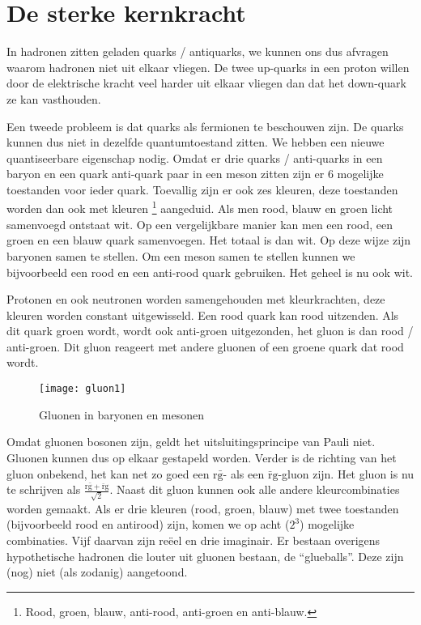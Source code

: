 \section{De sterke kernkracht}

In hadronen zitten geladen quarks / antiquarks, we kunnen ons dus
afvragen waarom hadronen niet uit elkaar vliegen. De twee up-quarks
in een proton willen door de elektrische kracht veel harder uit elkaar
vliegen dan dat het down-quark ze kan vasthouden. 

Een tweede probleem is dat quarks als fermionen te beschouwen zijn. De
quarks kunnen dus niet in dezelfde quantumtoestand zitten. We hebben een
nieuwe quantiseerbare eigenschap nodig. Omdat er drie quarks /
anti-quarks in een baryon en een quark anti-quark paar in een meson
zitten zijn er 6 mogelijke toestanden voor ieder quark. Toevallig zijn
er ook zes kleuren, deze toestanden worden dan ook met kleuren
\footnote{Rood, groen, blauw, anti-rood, anti-groen en anti-blauw.}
aangeduid. Als men rood, blauw en groen licht samenvoegd ontstaat wit.
Op een vergelijkbare manier kan men een rood, een groen en een blauw
quark samenvoegen. Het totaal is dan wit. Op deze wijze zijn baryonen
samen te stellen. Om een meson samen te stellen kunnen we bijvoorbeeld
een rood en een anti-rood quark gebruiken. Het geheel is nu ook wit.

Protonen en ook neutronen worden samengehouden met kleurkrachten,
deze kleuren worden constant uitgewisseld. Een rood quark kan rood
uitzenden. Als dit quark groen wordt, wordt ook anti-groen uit\-gezonden,
het gluon is dan rood / anti-groen. Dit gluon reageert met andere
gluonen of een groene quark dat rood wordt.

\begin{figure}[H]
\noindent \begin{centering}
\texttt{[image: gluon1]}
\par\end{centering}

\caption{Gluonen in baryonen en mesonen}
\end{figure}


Omdat gluonen bosonen zijn, geldt het uitsluitingsprincipe van Pauli
niet. Gluonen kunnen dus op elkaar gestapeld worden. Verder is de
richting van het gluon onbekend, het kan net zo goed een $\mathrm{r\bar{g}}$-
als een $\mathrm{\bar{r}g}$-gluon zijn. Het gluon is nu te schrijven
als $\frac{\mathrm{r\bar{g}+\bar{r}g}}{\sqrt{2}}$. Naast dit gluon
kunnen ook alle andere kleurcombinaties worden gemaakt. Als er drie
kleuren (rood, groen, blauw) met twee toestanden (bijvoorbeeld rood
en antirood) zijn, komen we op acht ($2^{3}$) mogelijke combinaties.
Vijf daarvan zijn reëel en drie imaginair. Er bestaan overigens hypothetische
hadronen die louter uit gluonen bestaan, de ``glueballs''. Deze
zijn (nog) niet (als zodanig) aangetoond.

